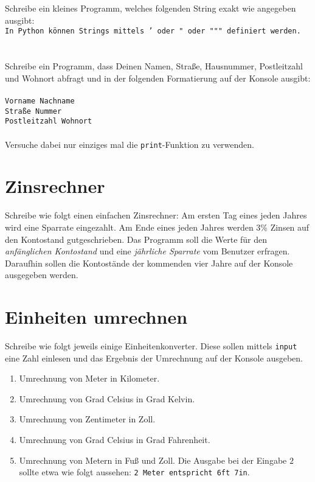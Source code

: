 \documentclass[a4paper]{article}
\begin{document}




\section{}
Schreibe ein kleines Programm, welches folgenden String exakt wie angegeben ausgibt:\\
\texttt{In Python können Strings mittels ' oder "{} oder "{}"{}"{} definiert werden.}
\section{}
Schreibe ein Programm, dass Deinen Namen, Straße, Hausnummer, Postleitzahl und Wohnort abfragt und in der folgenden Formatierung auf der Konsole ausgibt:\\ \\
\texttt{Vorname Nachname}\\
\texttt{Straße Nummer}\\
\texttt{Postleitzahl Wohnort}\\ \\
Versuche dabei nur einziges mal die \texttt{print}-Funktion zu verwenden.  
\section{Zinsrechner} 
Schreibe wie folgt einen einfachen Zinsrechner: Am ersten Tag eines jeden Jahres wird eine Sparrate eingezahlt. Am Ende eines jeden Jahres werden 3\% Zinsen auf den Kontostand gutgeschrieben. 
Das Programm soll die Werte für den \textit{anfänglichen Kontostand} und eine \textit{jährliche Sparrate} vom Benutzer erfragen. Daraufhin sollen die Kontostände der kommenden vier Jahre auf der Konsole ausgegeben werden.     

\section{Einheiten umrechnen}
Schreibe wie folgt jeweils einige Einheitenkonverter. Diese sollen mittels \texttt{input} eine Zahl einlesen und das Ergebnis der Umrechnung auf der Konsole ausgeben. 
\begin{enumerate}
\item Umrechnung von Meter in Kilometer.
\item Umrechnung von Grad Celsius in Grad Kelvin.
\item Umrechnung von Zentimeter in Zoll.
\item Umrechnung von Grad Celsius in Grad Fahrenheit.
\item Umrechnung von Metern in Fuß und Zoll. Die Ausgabe bei der Eingabe $2$ sollte etwa wie folgt aussehen: \texttt{2 Meter entspricht 6ft 7in}. 
\end{enumerate}
\end{document}
